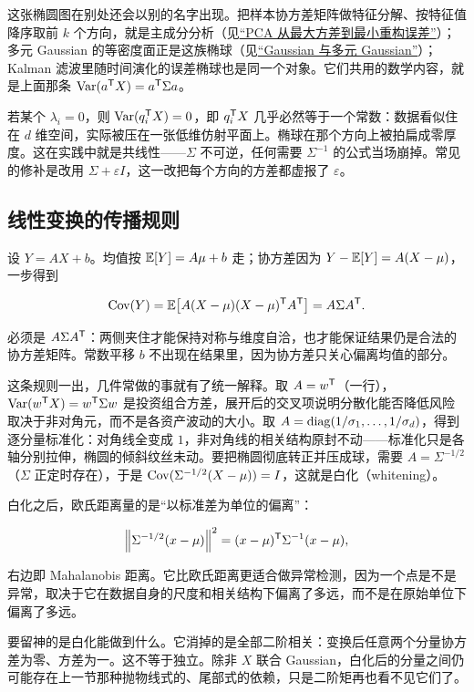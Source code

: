这张椭圆图在别处还会以别的名字出现。把样本协方差矩阵做特征分解、按特征值降序取前 \(k\) 个方向，就是主成分分析（见\hyperref[sec:13-Machine-Learning/04-Dimensionality-Reduction/01]{``PCA 从最大方差到最小重构误差''}）；多元 Gaussian 的等密度面正是这族椭球（见\hyperref[sec:05-Probability/06-Common-Distributions/05]{``Gaussian 与多元 Gaussian''}）；Kalman 滤波里随时间演化的误差椭球也是同一个对象。它们共用的数学内容，就是上面那条 \(\operatorname{Var}(a^{\mathsf{T}}X)=a^{\mathsf{T}}\Sigma a\)。

若某个 \(\lambda_i=0\)，则 \(\operatorname{Var}(q_i^{\mathsf{T}}X)=0\)，即 \(q_i^{\mathsf{T}}X\) 几乎必然等于一个常数：数据看似住在 \(d\) 维空间，实际被压在一张低维仿射平面上。椭球在那个方向上被拍扁成零厚度。这在实践中就是共线性——\(\Sigma\) 不可逆，任何需要 \(\Sigma^{-1}\) 的公式当场崩掉。常见的修补是改用 \(\Sigma+\varepsilon I\)，这一改把每个方向的方差都虚报了 \(\varepsilon\)。

\subsection{线性变换的传播规则}

设 \(Y=AX+b\)。均值按 \(\mathbb{E}[Y]=A\mu+b\) 走；协方差因为 \(Y-\mathbb{E}[Y]=A(X-\mu)\)，一步得到

\[
\operatorname{Cov}(Y)=\mathbb{E}\bigl[A(X-\mu)(X-\mu)^{\mathsf{T}}A^{\mathsf{T}}\bigr]=A\Sigma A^{\mathsf{T}}.
\]

必须是 \(A\Sigma A^{\mathsf{T}}\)：两侧夹住才能保持对称与维度自洽，也才能保证结果仍是合法的协方差矩阵。常数平移 \(b\) 不出现在结果里，因为协方差只关心偏离均值的部分。

这条规则一出，几件常做的事就有了统一解释。取 \(A=w^{\mathsf{T}}\)（一行），\(\operatorname{Var}(w^{\mathsf{T}}X)=w^{\mathsf{T}}\Sigma w\) 是投资组合方差，展开后的交叉项说明分散化能否降低风险取决于非对角元，而不是各资产波动的大小。取 \(A=\operatorname{diag}(1/\sigma_1,\ldots,1/\sigma_d)\)，得到逐分量标准化：对角线全变成 \(1\)，非对角线的相关结构原封不动——标准化只是各轴分别拉伸，椭圆的倾斜纹丝未动。要把椭圆彻底转正并压成球，需要 \(A=\Sigma^{-1/2}\)（\(\Sigma\) 正定时存在），于是 \(\operatorname{Cov}(\Sigma^{-1/2}(X-\mu))=I\)，这就是白化（whitening）。

白化之后，欧氏距离量的是``以标准差为单位的偏离''：

\[
\left\lVert\Sigma^{-1/2}(x-\mu)\right\rVert^2=(x-\mu)^{\mathsf{T}}\Sigma^{-1}(x-\mu),
\]

右边即 Mahalanobis 距离。它比欧氏距离更适合做异常检测，因为一个点是不是异常，取决于它在数据自身的尺度和相关结构下偏离了多远，而不是在原始单位下偏离了多远。

要留神的是白化能做到什么。它消掉的是全部二阶相关：变换后任意两个分量协方差为零、方差为一。这不等于独立。除非 \(X\) 联合 Gaussian，白化后的分量之间仍可能存在上一节那种抛物线式的、尾部式的依赖，只是二阶矩再也看不见它们了。

